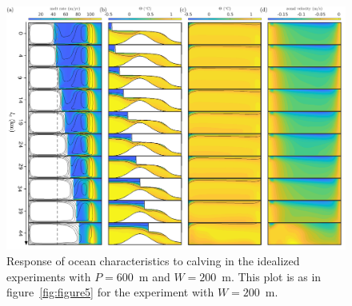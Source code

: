 \documentclass[draft]{agujournal2019}
\begin{document}
\begin{figure}
    \centering
    \includegraphics[width = \textwidth]{../make_figures/plots/figure7.pdf}
    \caption{Response of ocean characteristics to calving in the idealized experiments with $P=600$~m and $W=200$~m. This plot is as in figure~\ref{fig:figure5} for the experiment with $W=200$~m.}
    \label{fig:figure7}
\end{figure}
\end{document}
